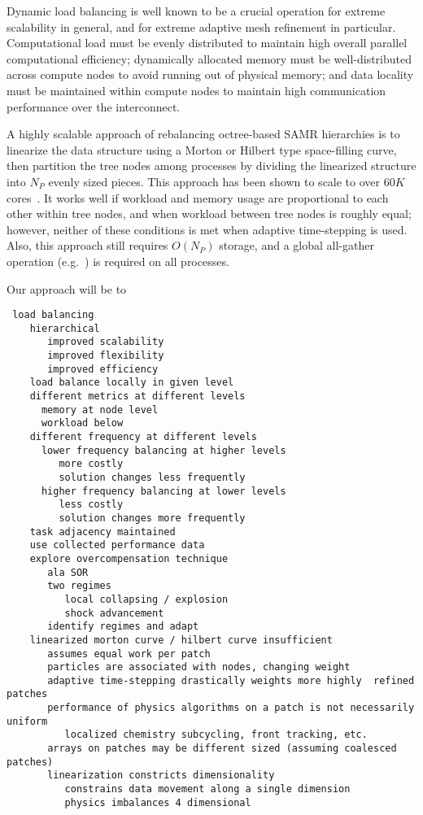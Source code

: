 \documentclass{article}
\begin{document}
Dynamic load balancing is well known to be a crucial operation for
extreme scalability in general, and for extreme adaptive mesh
refinement in particular.  Computational load must be evenly
distributed to maintain high overall parallel computational
efficiency; dynamically allocated memory must be well-distributed
across compute nodes to avoid running out of physical memory; and data
locality must be maintained within compute nodes to maintain high
communication performance over the interconnect.

A highly scalable approach of rebalancing octree-based SAMR
hierarchies is to linearize the data structure using a Morton or
Hilbert type space-filling curve, then partition the tree nodes among
processes by dividing the linearized structure into $N_P$ evenly sized
pieces.  This approach has been shown to scale to over $60K$
cores~\cite{@@@ART}.  It works well if workload and memory usage are
proportional to each other within tree nodes, and when workload
between tree nodes is roughly equal; however, neither of these
conditions is met when adaptive time-stepping is used.  Also, this
approach still requires $O(N_P)$ storage, and a global all-gather
operation (e.g.~) is required on all processes.

Our approach will be to 

\begin{verbatim}
 load balancing
    hierarchical
       improved scalability
       improved flexibility
       improved efficiency
    load balance locally in given level
    different metrics at different levels
      memory at node level
      workload below
    different frequency at different levels
      lower frequency balancing at higher levels
         more costly
         solution changes less frequently
      higher frequency balancing at lower levels
         less costly
         solution changes more frequently
    task adjacency maintained
    use collected performance data
    explore overcompensation technique
       ala SOR
       two regimes
          local collapsing / explosion
          shock advancement
       identify regimes and adapt
    linearized morton curve / hilbert curve insufficient
       assumes equal work per patch
       particles are associated with nodes, changing weight
       adaptive time-stepping drastically weights more highly  refined patches
       performance of physics algorithms on a patch is not necessarily uniform
          localized chemistry subcycling, front tracking, etc.
       arrays on patches may be different sized (assuming coalesced patches)
       linearization constricts dimensionality
          constrains data movement along a single dimension
          physics imbalances 4 dimensional
\end{verbatim}
\end{document}
